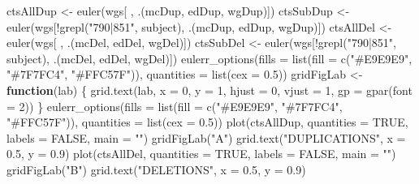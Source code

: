 \documentclass[11pt,letterpaper,oneside]{book}
\newenvironment{Shaded}{\begin{snugshade}}{\end{snugshade}}
\newcommand{\AttributeTok}[1]{\textcolor[rgb]{0.77,0.63,0.00}{#1}}
\newcommand{\ConstantTok}[1]{\textcolor[rgb]{0.00,0.00,0.00}{#1}}
\newcommand{\ControlFlowTok}[1]{\textcolor[rgb]{0.13,0.29,0.53}{\textbf{#1}}}
\newcommand{\DecValTok}[1]{\textcolor[rgb]{0.00,0.00,0.81}{#1}}
\newcommand{\FloatTok}[1]{\textcolor[rgb]{0.00,0.00,0.81}{#1}}
\newcommand{\FunctionTok}[1]{\textcolor[rgb]{0.00,0.00,0.00}{#1}}
\newcommand{\NormalTok}[1]{#1}
\newcommand{\OtherTok}[1]{\textcolor[rgb]{0.56,0.35,0.01}{#1}}
\newcommand{\SpecialCharTok}[1]{\textcolor[rgb]{0.00,0.00,0.00}{#1}}
\newcommand{\StringTok}[1]{\textcolor[rgb]{0.31,0.60,0.02}{#1}}
\begin{document}
\begin{Shaded}
\begin{Highlighting}[]
\NormalTok{ctsAllDup }\OtherTok{\textless{}{-}} \FunctionTok{euler}\NormalTok{(wgs[ , .(mcDup, edDup, wgDup)])}
\NormalTok{ctsSubDup }\OtherTok{\textless{}{-}} \FunctionTok{euler}\NormalTok{(wgs[}\SpecialCharTok{!}\FunctionTok{grepl}\NormalTok{(}\StringTok{"790|851"}\NormalTok{, subject), .(mcDup, edDup, wgDup)])}
\NormalTok{ctsAllDel }\OtherTok{\textless{}{-}} \FunctionTok{euler}\NormalTok{(wgs[ , .(mcDel, edDel, wgDel)])}
\NormalTok{ctsSubDel }\OtherTok{\textless{}{-}} \FunctionTok{euler}\NormalTok{(wgs[}\SpecialCharTok{!}\FunctionTok{grepl}\NormalTok{(}\StringTok{"790|851"}\NormalTok{, subject), .(mcDel, edDel, wgDel)])}
\FunctionTok{eulerr\_options}\NormalTok{(}\AttributeTok{fills =} \FunctionTok{list}\NormalTok{(}\AttributeTok{fill =} \FunctionTok{c}\NormalTok{(}\StringTok{"\#E9E9E9"}\NormalTok{, }\StringTok{"\#7F7FC4"}\NormalTok{, }\StringTok{"\#FFC57F"}\NormalTok{)),}
               \AttributeTok{quantities =} \FunctionTok{list}\NormalTok{(}\AttributeTok{cex =} \FloatTok{0.5}\NormalTok{))}
\NormalTok{gridFigLab }\OtherTok{\textless{}{-}} \ControlFlowTok{function}\NormalTok{(lab) \{}
  \FunctionTok{grid.text}\NormalTok{(lab, }\AttributeTok{x =} \DecValTok{0}\NormalTok{, }\AttributeTok{y =} \DecValTok{1}\NormalTok{, }\AttributeTok{hjust =} \DecValTok{0}\NormalTok{, }\AttributeTok{vjust =} \DecValTok{1}\NormalTok{, }\AttributeTok{gp =} \FunctionTok{gpar}\NormalTok{(}\AttributeTok{font =} \DecValTok{2}\NormalTok{))}
\NormalTok{\}}
\FunctionTok{eulerr\_options}\NormalTok{(}\AttributeTok{fills =} \FunctionTok{list}\NormalTok{(}\AttributeTok{fill =} \FunctionTok{c}\NormalTok{(}\StringTok{"\#E9E9E9"}\NormalTok{, }\StringTok{"\#7F7FC4"}\NormalTok{, }\StringTok{"\#FFC57F"}\NormalTok{)),}
               \AttributeTok{quantities =} \FunctionTok{list}\NormalTok{(}\AttributeTok{cex =} \FloatTok{0.5}\NormalTok{))}
\FunctionTok{plot}\NormalTok{(ctsAllDup, }\AttributeTok{quantities =} \ConstantTok{TRUE}\NormalTok{, }\AttributeTok{labels =} \ConstantTok{FALSE}\NormalTok{, }\AttributeTok{main =} \StringTok{""}\NormalTok{)}
\FunctionTok{gridFigLab}\NormalTok{(}\StringTok{"A"}\NormalTok{)}
\FunctionTok{grid.text}\NormalTok{(}\StringTok{"DUPLICATIONS"}\NormalTok{, }\AttributeTok{x =} \FloatTok{0.5}\NormalTok{, }\AttributeTok{y =} \FloatTok{0.9}\NormalTok{)}
\FunctionTok{plot}\NormalTok{(ctsAllDel, }\AttributeTok{quantities =} \ConstantTok{TRUE}\NormalTok{, }\AttributeTok{labels =} \ConstantTok{FALSE}\NormalTok{, }\AttributeTok{main =} \StringTok{""}\NormalTok{)}
\FunctionTok{gridFigLab}\NormalTok{(}\StringTok{"B"}\NormalTok{)}
\FunctionTok{grid.text}\NormalTok{(}\StringTok{"DELETIONS"}\NormalTok{, }\AttributeTok{x =} \FloatTok{0.5}\NormalTok{, }\AttributeTok{y =} \FloatTok{0.9}\NormalTok{)}


\end{Highlighting}
\end{Shaded}
\end{document}
